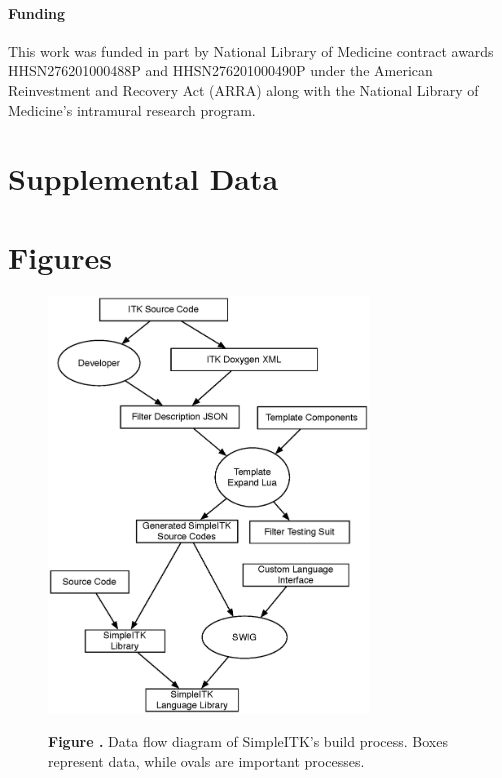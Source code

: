 \documentclass{frontiersMED} %
\begin{document}
\paragraph{Funding\textcolon}

This work was funded in part by National Library of Medicine contract
awards HHSN276201000488P and HHSN276201000490P under the American
Reinvestment and Recovery Act (ARRA) along with the National Library
of Medicine's intramural research program.

\section*{Supplemental Data}




\section*{Figures}


\begin{figure}
\begin{center}
\includegraphics[width=8.5cm]{images/fig1_dataflow}
\end{center}
 \textbf{\label{fig:01} Figure
   .}{ Data flow diagram of SimpleITK's build process. Boxes represent data, while ovals are important processes. }
\end{figure}
\end{document}
